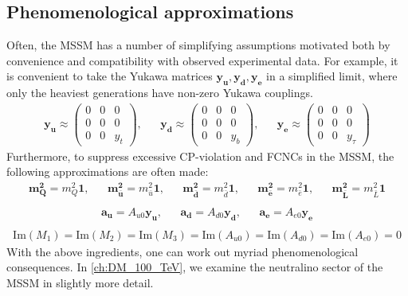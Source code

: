 \subsection{Phenomenological approximations}
Often, the MSSM has a number of simplifying assumptions motivated both by convenience and compatibility with observed experimental data. For example, it is convenient to take the Yukawa matrices $\mathbf{y_u,y_d,y_e}$ in a simplified limit, where only the heaviest generations have non-zero Yukawa couplings. 
\begin{align*}
  \mathbf{y_u} \approx \begin{pmatrix}
    0 & 0 & 0\\
    0 & 0 & 0\\
    0 & 0 & y_t
  \end{pmatrix},&&
  \mathbf{y_d} \approx \begin{pmatrix}
    0 & 0 & 0\\
    0 & 0 & 0\\
    0 & 0 & y_b
  \end{pmatrix},&&
  \mathbf{y_e} \approx \begin{pmatrix}
    0 & 0 & 0\\
    0 & 0 & 0\\
    0 & 0 & y_\tau
  \end{pmatrix}
\end{align*}
Furthermore, to suppress excessive CP-violation and FCNCs in the MSSM, the following approximations are often made:
\begin{align*}
  \mathbf{m_Q^2} = m_Q^2\mathbf{1},&&
  \mathbf{m_{\bar{u}}^2} = m_{\bar{u}}^2\mathbf{1},&&
  \mathbf{m_{\bar{d}}^2} = m_{\bar{d}}^2\mathbf{1},&&
  \mathbf{m_{\bar{e}}^2} = m_{\bar{e}}^2\mathbf{1},&&
  \mathbf{m_{\bar{L}}^2} = m_{\bar{L}}^2\mathbf{1}\\
\end{align*}
\begin{align*}
  \mathbf{a_u} = A_{u0}\mathbf{y_u},&&
  \mathbf{a_d} = A_{d0}\mathbf{y_d},&&
  \mathbf{a_e} = A_{e0}\mathbf{y_e}\\
\end{align*}
\begin{align*}
  \text{Im}(M_1)=
  \text{Im}(M_2)=
  \text{Im}(M_3)=
  \text{Im}(A_{u0})=
  \text{Im}(A_{d0})=
  \text{Im}(A_{e0})=0
\end{align*}
With the above ingredients, one can work out myriad phenomenological consequences. In \autoref{ch:DM_100_TeV}, we examine the neutralino sector of the MSSM in slightly more detail.

